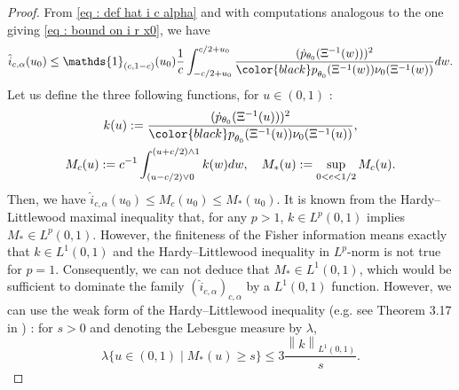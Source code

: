 \documentclass[a4paper, 11pt]{article}
\theoremstyle{definition}
\newcommand{\norm}[1]{\left\|{#1}\right\|}
\newcommand{\modar}{\color{black}}
\newcommand{\indi}[1]{\mathds{1}_{#1}}
\begin{document}
{\begin{proof}
From \eqref{eq : def hat i c alpha} and with computations analogous to the one giving \eqref{eq : bound on i r x0}, we have
\begin{equation*}
	\hat{i}_{c,\alpha}(u_0)  \le \indi{(c,1-c)}(u_0) \frac{1}{c} \int_{-c/2+u_0}^{c/2+u_0} \frac{(\dot{p}_{\theta_0}(\Xi^{-1}(w)))^2}
	{{\modar p}_{\theta_0}(\Xi^{-1}(w))\nu_0(\Xi^{-1}(w))} dw.
\end{equation*}
Let us define the three following functions, {\modar for $u\in(0,1)$} :
\begin{gather*}
	k(u):= \frac{(\dot{p}_{\theta_0}(\Xi^{-1}(u)))^2}
	{{\modar p}_{\theta_0}(\Xi^{-1}(u))\nu_0(\Xi^{-1}(u))},
	\\ %
	M_c(u):=c^{-1}\int_{(u-c/2)\vee 0}^{(u+c/2) \wedge 1} k(w)dw,
	\quad
	M_*(u):=\sup_{0<c<1/2}	M_c(u)	.
\end{gather*}	
Then, we have $		\hat{i}_{c,\alpha}(u_0)   \le M_c(u_0) \le M_*(u_0)$. It is known from the Hardy--Littlewood maximal inequality that, for any $p>1$, $k\in L^p(0,1)$ implies $M_* \in L^p(0,1)$. However, the finiteness of the Fisher information means exactly that $k \in L^1(0,1)$ and the Hardy--Littlewood inequality in $L^p$-norm is not true for $p=1$. Consequently,  we can not deduce that $M_* \in L^1(0,1)$, which would be sufficient to dominate  the family 	$(\hat{i}_{c,\alpha})_{c,\alpha}$ by a {\modar $L^1(0,1)$} function. However, we can use the weak form of the Hardy--Littlewood inequality (e.g. see Theorem 3.17 in \cite{follandRealAnalysisModern1999}) : for $s>0$ and denoting the Lebesgue measure by $\lambda$,
\begin{equation} \label{eq : Hardy-Littlewood}
	\lambda\{ u \in (0,1) \mid M_*(u) \ge s\} \le 3 \frac{\norm{k}_{L^1(0,1)}}{s}.
\end{equation}


\end{proof}}
\end{document}
